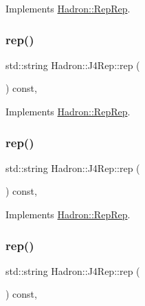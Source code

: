 Implements \mbox{\hyperlink{structHadron_1_1RepRep_ab3213025f6de249f7095892109575fde}{Hadron\+::\+Rep\+Rep}}.

\mbox{\label{structHadron_1_1J4Rep_a2dcdb2a04a0f8207e99fffb770037b9e}} 
\subsubsection{\texorpdfstring{rep()}{rep()}\hspace{0.1cm}{\footnotesize\ttfamily [2/5]}}
{\footnotesize\ttfamily std\+::string Hadron\+::\+J4\+Rep\+::rep (\begin{DoxyParamCaption}{ }\end{DoxyParamCaption}) const\hspace{0.3cm}{\ttfamily [inline]}, {\ttfamily [virtual]}}



Implements \mbox{\hyperlink{structHadron_1_1RepRep_ab3213025f6de249f7095892109575fde}{Hadron\+::\+Rep\+Rep}}.

\mbox{\label{structHadron_1_1J4Rep_a2dcdb2a04a0f8207e99fffb770037b9e}} 
\subsubsection{\texorpdfstring{rep()}{rep()}\hspace{0.1cm}{\footnotesize\ttfamily [3/5]}}
{\footnotesize\ttfamily std\+::string Hadron\+::\+J4\+Rep\+::rep (\begin{DoxyParamCaption}{ }\end{DoxyParamCaption}) const\hspace{0.3cm}{\ttfamily [inline]}, {\ttfamily [virtual]}}



Implements \mbox{\hyperlink{structHadron_1_1RepRep_ab3213025f6de249f7095892109575fde}{Hadron\+::\+Rep\+Rep}}.

\mbox{\label{structHadron_1_1J4Rep_a2dcdb2a04a0f8207e99fffb770037b9e}} 
\subsubsection{\texorpdfstring{rep()}{rep()}\hspace{0.1cm}{\footnotesize\ttfamily [4/5]}}
{\footnotesize\ttfamily std\+::string Hadron\+::\+J4\+Rep\+::rep (\begin{DoxyParamCaption}{ }\end{DoxyParamCaption}) const\hspace{0.3cm}{\ttfamily [inline]}, {\ttfamily [virtual]}}



